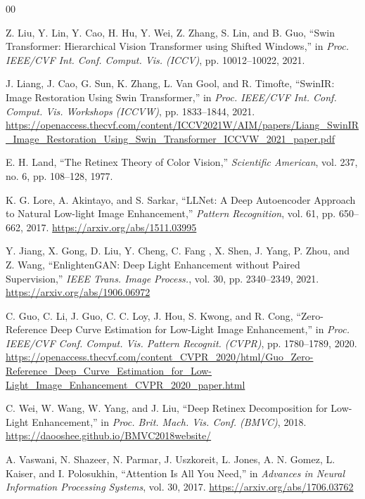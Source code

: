 \documentclass[conference]{IEEEtran}
\begin{document}
\begin{thebibliography}{00}

Z. Liu, Y. Lin, Y. Cao, H. Hu, Y. Wei, Z. Zhang, S. Lin, and B. Guo, ``Swin Transformer: Hierarchical Vision Transformer using Shifted Windows,'' in \textit{Proc. IEEE/CVF Int. Conf. Comput. Vis. (ICCV)}, pp. 10012--10022, 2021.

J. Liang, J. Cao, G. Sun, K. Zhang, L. Van Gool, and R. Timofte, ``SwinIR: Image Restoration Using Swin Transformer,'' in \textit{Proc. IEEE/CVF Int. Conf. Comput. Vis. Workshops (ICCVW)}, pp. 1833--1844, 2021. \url{https://openaccess.thecvf.com/content/ICCV2021W/AIM/papers/Liang_SwinIR_Image_Restoration_Using_Swin_Transformer_ICCVW_2021_paper.pdf}

E. H. Land, ``The Retinex Theory of Color Vision,'' \textit{Scientific American}, vol. 237, no. 6, pp. 108--128, 1977.

K. G. Lore, A. Akintayo, and S. Sarkar, ``LLNet: A Deep Autoencoder Approach to Natural Low-light Image Enhancement,'' \textit{Pattern Recognition}, vol. 61, pp. 650--662, 2017. \url{https://arxiv.org/abs/1511.03995}

Y. Jiang, X. Gong, D. Liu, Y. Cheng, C. Fang , X. Shen, J. Yang, P. Zhou, and Z. Wang, ``EnlightenGAN: Deep Light Enhancement without Paired Supervision,'' \textit{IEEE Trans. Image Process.}, vol. 30, pp. 2340--2349, 2021. \url{https://arxiv.org/abs/1906.06972}

C. Guo, C. Li, J. Guo, C. C. Loy, J. Hou, S. Kwong, and R. Cong, ``Zero-Reference Deep Curve Estimation for Low-Light Image Enhancement,'' in \textit{Proc. IEEE/CVF Conf. Comput. Vis. Pattern Recognit. (CVPR)}, pp. 1780--1789, 2020. \url{https://openaccess.thecvf.com/content_CVPR_2020/html/Guo_Zero-Reference_Deep_Curve_Estimation_for_Low-Light_Image_Enhancement_CVPR_2020_paper.html}

C. Wei, W. Wang, W. Yang, and J. Liu, ``Deep Retinex Decomposition for Low-Light Enhancement,'' in \textit{Proc. Brit. Mach. Vis. Conf. (BMVC)}, 2018. \url{https://daooshee.github.io/BMVC2018website/}

A. Vaswani, N. Shazeer, N. Parmar, J. Uszkoreit, L. Jones, A. N. Gomez, L. Kaiser, and I. Polosukhin, ``Attention Is All You Need,'' in \textit{Advances in Neural Information Processing Systems}, vol. 30, 2017. \url{https://arxiv.org/abs/1706.03762}


\end{thebibliography}
\end{document}
